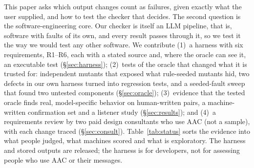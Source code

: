 \documentclass[conference,10pt]{IEEEtran}
\begin{document}
This paper asks which output changes count as failures, given exactly what the user supplied, and how to test the checker that decides.
The second question is the software-engineering core.
Our checker is itself an LLM pipeline, that is, software with faults of its own, and every result passes through it, so we test it the way we would test any other software.
We contribute
(1)~a harness with six requirements, R1--R6, each with a stated source and, where the oracle can see it, an executable test (\S\ref{sec:harness});
(2)~tests of the oracle that changed what it is trusted for: independent mutants that exposed what rule-seeded mutants hid, two defects in our own harness turned into regression tests, and a seeded-fault sweep that found two untested components (\S\ref{sec:oracle});
(3)~evidence that the tested oracle finds real, model-specific behavior on human-written pairs, a machine-written confirmation set and a listener study (\S\ref{sec:results}); and
(4)~a requirements review by two paid design consultants who use AAC (not a sample), with each change traced (\S\ref{sec:consult}).
Table~\ref{tab:status} sorts the evidence into what people judged, what machines scored and what is exploratory.
The harness and stored outputs are released; the harness is for developers, not for assessing people who use AAC or their messages.
\end{document}
